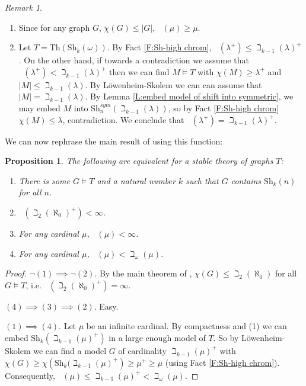 \documentclass[a4paper]{amsart}
\theoremstyle{plain}
\newtheorem{proposition}[theorem]{Proposition}
\theoremstyle{definition}
\theoremstyle{remark}
\newtheorem{remark}[theorem]{Remark}
\numberwithin{equation}{section}
\newcommand{\Sh}{\text{Sh}}
\DeclareMathOperator{\ch}{ch_T}
\begin{document}
\begin{remark}
\begin{enumerate}
\item Since for any graph $G$, $\chi(G)\leq |G|$, $\ch(\mu)\geq \mu$.
\item Let $T=\mathrm{Th}(\Sh_k(\omega))$. By Fact \ref{F:Sh-high chrom}, $\ch(\lambda^+)\leq \beth_{k-1}(\lambda)^+$. On the other hand, if towards a contradiction we assume that $\ch(\lambda^+)<\beth_{k-1}(\lambda)^+$ then we can find $M\vDash T$ with $\chi(M)\geq \lambda^+$ and $|M|\leq \beth_{k-1}(\lambda)$. By L\"owenheim-Skolem we can can assume that $|M|=\beth_{k-1}(\lambda)$. By Lemma \ref{L:embed model of shift into symmetric}, we may embed $M$ into $\Sh_n^{sym}(\beth_{k-1}(\lambda))$, so by Fact \ref{F:Sh-high chrom} $\chi(M)\leq \lambda$, contradiction. We conclude that $\ch(\lambda^+)=\beth_{k-1}(\lambda)^+$.
\end{enumerate}
\end{remark}

We can now rephrase the main result of \cite{1211} using this function:

\begin{proposition}
The following are equivalent for a stable theory of graphs  $T$:
\begin{enumerate}
\item There is some $G\vDash T$ and a natural number $k$ such that $G$ contains $\Sh_k(n)$ for all $n$.
\item $\ch(\beth_2(\aleph_0)^+)< \infty$.
\item For any cardinal $\mu$,  $\ch(\mu)< \infty$.
\item For any  cardinal $\mu$, $\ch(\mu)< \beth_\omega(\mu)$.
\end{enumerate}
\end{proposition}
\begin{proof}
$\neg (1)\implies \neg (2)$. By the main theorem of \cite[Corollary 6.2]{1211}, $\chi(G)\leq \beth_2(\aleph_0)$ for all $G\vDash T$, i.e. $\ch(\beth_2(\aleph_0)^+)=\infty$.

$(4)\implies (3)\implies (2)$. Easy.

$(1)\implies (4)$.  Let $\mu$ be an infinite cardinal. By compactness and (1) we can embed $\Sh_k(\beth_{k-1}(\mu)^+)$ in a large enough model of $T$. So by L\"owenheim-Skolem we can find a model $G$ of cardinality $\beth_{k-1}(\mu)^+$ with $\chi(G)\geq \chi\left(\Sh_k(\beth_{k-1}(\mu)^+\right)\geq \mu^+\geq \mu$ (using Fact \ref{F:Sh-high chrom}). Consequently, $\ch(\mu)\leq\beth_{k-1}(\mu)^+< \beth_\omega(\mu)$.
\end{proof}
\end{document}
